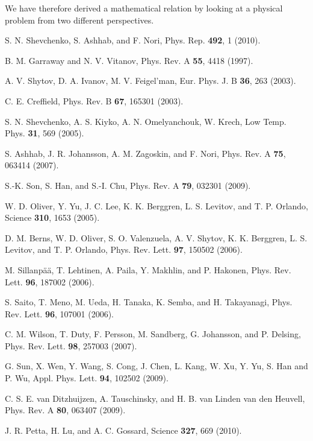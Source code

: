 \documentclass[aps,twocolumn,superscriptaddress]{revtex4}
\begin{document}
We have therefore derived a mathematical relation by looking at a physical problem from two different perspectives.



\begin{thebibliography}{99}

 S. N. Shevchenko, S. Ashhab, and F. Nori, Phys. Rep. {\bf 492}, 1 (2010).

 B. M. Garraway and N. V. Vitanov, Phys. Rev. A {\bf 55}, 4418 (1997).

 A. V. Shytov, D. A. Ivanov, M. V. Feigel'man, Eur. Phys. J. B {\bf 36}, 263 (2003).

 C. E. Creffield, Phys. Rev. B {\bf 67}, 165301 (2003).

 S. N. Shevchenko, A. S. Kiyko, A. N. Omelyanchouk, W. Krech, Low Temp. Phys. {\bf 31}, 569 (2005).

 S. Ashhab, J. R. Johansson, A. M. Zagoskin, and F. Nori, Phys. Rev. A {\bf 75}, 063414 (2007).

 S.-K. Son, S. Han, and S.-I. Chu, Phys. Rev. A {\bf 79}, 032301 (2009).

 W. D. Oliver, Y. Yu, J. C. Lee, K. K. Berggren, L. S. Levitov, and T. P. Orlando, Science {\bf 310}, 1653 (2005).

 D. M. Berns, W. D. Oliver, S. O. Valenzuela, A. V. Shytov, K. K. Berggren, L. S. Levitov, and T. P. Orlando, Phys. Rev. Lett. {\bf 97}, 150502 (2006).

 M. Sillanp\"a\"a, T. Lehtinen, A. Paila, Y. Makhlin, and P. Hakonen, Phys. Rev. Lett. {\bf 96}, 187002 (2006).

 S. Saito, T. Meno, M. Ueda, H. Tanaka, K. Semba, and H. Takayanagi, Phys. Rev. Lett. {\bf 96}, 107001 (2006).

 C. M. Wilson, T. Duty, F. Persson, M. Sandberg, G. Johansson, and P. Delsing, Phys. Rev. Lett. {\bf 98}, 257003 (2007).

 G. Sun, X. Wen, Y. Wang, S. Cong, J. Chen, L. Kang, W. Xu, Y. Yu, S. Han and P. Wu, Appl. Phys. Lett. {\bf 94}, 102502 (2009).

 C. S. E. van Ditzhuijzen, A. Tauschinsky, and H. B. van Linden van den Heuvell, Phys. Rev. A {\bf 80}, 063407 (2009).

 J. R. Petta, H. Lu, and A. C. Gossard, Science {\bf 327}, 669 (2010).


\end{thebibliography}
\end{document}
